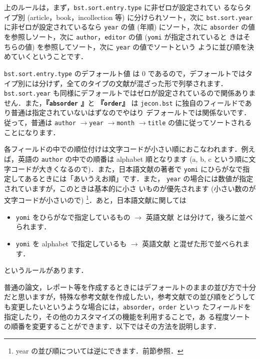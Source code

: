 \documentclass[a4j,10pt]{jarticle}
\begin{document}
上のルールは，まず，\texttt{bst.sort.entry.type} に非ゼロが設定されてい
るならタイプ別 (article，book，incollection 等) に分けられソート，次に 
\texttt{bst.sort.year} に非ゼロが設定されているなら \texttt{year} の値 
(年順) にソート，次に \texttt{absorder} の値を参照しソート，次に 
\texttt{author}，\texttt{editor} の値 (\texttt{yomi} が指定されていると
きはそちらの値) を参照してソート，次に \texttt{year} の値でソートという
ように並び順を決めていくということです．

\texttt{bst.sort.entry.type} のデフォールト値 は 0 であるので，デフォールトではタ
イプ別には分けず，全てのタイプの文献が混ざった形で列挙されます．
\texttt{bst.sort.year} も同様にデフォールトではゼロが設定されているので関係ありま
せん．また，\textbf{『\texttt{absorder} 』}と \textbf {『\texttt{order}』} は
\texttt{jecon.bst} に独自のフィールドであり普通は指定されていないはずなのでやはり
デフォールトでは関係ないです．従って，普通は \texttt{author}
$\rightarrow$\texttt{year} $\rightarrow$\texttt{month}
$\rightarrow$\texttt{title} の値に従ってソートされることになります．

各フィールドの中での順位付けは文字コードが小さい順におこなわれます．例え
ば，英語の \texttt{author} の中での順番は alphabet 順となります (a, b, c 
という順に文字コードが大きくなるので)．また，日本語文献の著者で
\texttt{yomi} にひらがなで指定してあるときには「あいうえお順」です．また，
\texttt{year} の場合には数値が指定されていますが，このときは基本的に小さ
いものが優先されます (小さい数のが文字コードが小さいので) \footnote{year 
の並び順については逆にできます．前節参照．}．あと，日本語文献に関しては
\begin{itemize}
 \item \texttt{yomi} をひらがなで指定しているもの $\rightarrow$ 英語文献
       とは分けて，後ろに並べられます．
 \item \texttt{yomi} を alphabet で指定しているも $\rightarrow$ 英語文献
       と混ぜた形で並べられます．
\end{itemize}
というルールがあります．


普通の論文，レポート等を作成するときにはデフォールトのままの並び方で十分
だと思いますが，特殊な参考文献を作成したい，参考文献での並び順をどうして
も変更したいというような場合には，\texttt{absorder}，\texttt{order} といっ
たフィールドを指定したり，その他のカスタマイズの機能を利用することで，あ
る程度ソートの順番を変更することができます．以下ではその方法を説明します．
\end{document}
